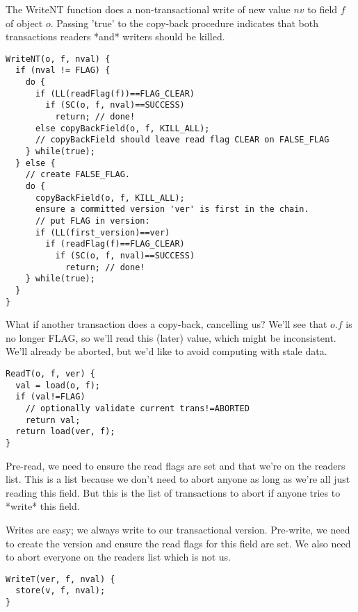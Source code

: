 \documentclass[preprint]{rdbacmconf}
\begin{document}
The WriteNT function does a non-transactional write of new value $nv$
to field $f$ of object $o$.  Passing 'true' to the copy-back procedure
indicates that both transactions readers *and* writers should be killed.
\par {\footnotesize\samepage
\begin{verbatim}
WriteNT(o, f, nval) {
  if (nval != FLAG) {
    do {
      if (LL(readFlag(f))==FLAG_CLEAR)
        if (SC(o, f, nval)==SUCCESS)
          return; // done!
      else copyBackField(o, f, KILL_ALL);
      // copyBackField should leave read flag CLEAR on FALSE_FLAG
    } while(true);
  } else {
    // create FALSE_FLAG.
    do {
      copyBackField(o, f, KILL_ALL);
      ensure a committed version 'ver' is first in the chain.
      // put FLAG in version:
      if (LL(first_version)==ver)
        if (readFlag(f)==FLAG_CLEAR)
          if (SC(o, f, nval)==SUCCESS)
            return; // done!
    } while(true);
  }
}
\end{verbatim}
}


What if another transaction does a copy-back, cancelling us?
We'll see that $o.f$ is no longer FLAG, so we'll read this
(later) value, which might be inconsistent.  We'll already
be aborted, but we'd like to avoid computing with
stale data.
\par {\footnotesize\samepage
\begin{verbatim}
ReadT(o, f, ver) {
  val = load(o, f);
  if (val!=FLAG)
    // optionally validate current trans!=ABORTED
    return val;
  return load(ver, f);
}
\end{verbatim}
}
Pre-read, we need to ensure the read flags are set and that we're on
the readers list.  This is a list because we don't need to abort
anyone as long as we're all just reading this field.  But this is the
list of transactions to abort if anyone tries to *write* this field.

Writes are easy; we always write to our transactional version.
Pre-write, we need to create the version and ensure the read
flags for this field are set.  We also need to abort everyone on
the readers list which is not us.
\par {\footnotesize\samepage
\begin{verbatim}
WriteT(ver, f, nval) {
  store(v, f, nval);
}
\end{verbatim}
}
\end{document}
